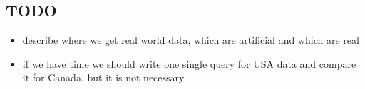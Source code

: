 \subsection{TODO} %
\label{sub:TODO}

\begin{itemize}
    \item describe where we get real world data, which are artificial and which are real
    \item if we have time we should write one single query for USA data and compare it for Canada,
            but it is not necessary
\end{itemize}

